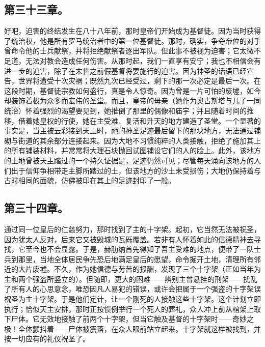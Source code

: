 
\subsection{第三十三章。}

好吧，迫害的终结发生在八十八年前，那时皇帝们开始成为基督徒。因为当时获得了统治权，他是所有罗马统治者中的第一位基督徒。那时，确实，争夺帝位的对手曾命令他的士兵献祭，并将拒绝献祭者逐出军队。但此事不被视为迫害；它太微不足道，无法对教会造成任何伤害。从那时起，我们一直享有安宁；我也不相信会有进一步的迫害，除了在末世之前假基督将要施行的迫害。因为神圣的话语已经宣告，世界将遭受十次灾祸；既然九次已经受过，剩下的那一次必定是最后一次。在这段时期，基督徒宗教如何盛行，真是令人惊奇。因为曾是一片可怕的废墟，如今却装饰着极为众多而宏伟的圣堂。而且，皇帝的母亲（她作为奥古斯塔与儿子一同统治）怀着强烈的渴望要见到，她推倒了那里的偶像和庙宇；并且随着时间的推移，借着她皇权的行使，她在主受难、复活和升天的地方建造了圣堂。一个显著的事实是，当主被云彩接到天上时，祂的神圣足迹最后留下的那块地方，无法通过铺砌与街道的其余部分连接起来。因为大地不习惯纯粹的人类接触，拒绝了施加其上的所有铺装材料，并常常将大理石块抛回试图铺设它们的人的脸上。此外，该地方的土地曾被天主踏过的一个持久证据是，足迹仍然可见；尽管每天涌向该地方的人们出于信仰争相带走主脚所踏过的土，但该地方的沙土未受损伤；大地仍保持着与古时相同的面貌，仿佛被印在其上的足迹封印了一般。\par


\subsection{第三十四章。}

通过同一位皇后的仁慈努力，那时找到了主的十字架。起初，它当然无法被祝圣，因为犹太人反对，后来它又被毁城的瓦砾覆盖。若非有人怀着如此的信德精神去寻找，它至今也不会显露。于是，赫肋纳首先得知了吾主受难的地点，便带了一队士兵到那里，当地全体居民争先恐后地满足皇后的愿望，命令掘开土地，清理所有邻近的大片废墟。不久，作为她信德与劳苦的报酬，发现了三个十字架（正如当年为主和两个强盗所竖立的）。但随即，更大的困难——辨别主曾悬挂的刑架——扰乱了所有人的心思意念，唯恐因凡人易犯的错误，或许会把属于一个强盗的十字架误祝圣为主十字架。于是他们定计，让一个刚死的人接触这些十字架。这个计划立即执行；恰似天主安排，那时正按惯例举行一个死人的葬礼，众人冲上前从棺架上取下尸体。它无效地接触了前两个十字架，但当它触及基督的十字架时——奇妙之极！全体颤抖着——尸体被震落，在众人眼前站立起来。十字架就这样被找到，并按一切应有的礼仪祝圣了。\par


